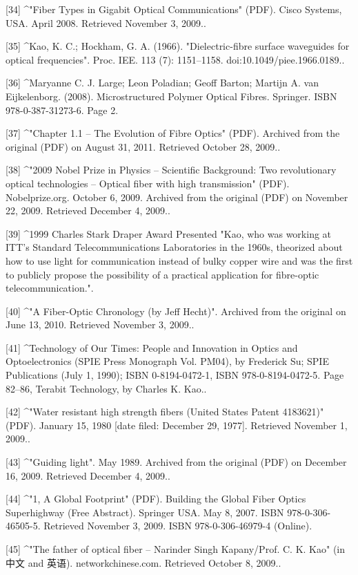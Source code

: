 [34]
^"Fiber Types in Gigabit Optical Communications" (PDF). Cisco Systems, USA. April 2008. Retrieved November 3, 2009..

[35]
^Kao, K. C.; Hockham, G. A. (1966). "Dielectric-fibre surface waveguides for optical frequencies". Proc. IEE. 113 (7): 1151–1158. doi:10.1049/piee.1966.0189..

[36]
^Maryanne C. J. Large; Leon Poladian; Geoff Barton; Martijn A. van Eijkelenborg. (2008). Microstructured Polymer Optical Fibres. Springer. ISBN 978-0-387-31273-6. Page 2.

[37]
^"Chapter 1.1 – The Evolution of Fibre Optics" (PDF). Archived from the original (PDF) on August 31, 2011. Retrieved October 28, 2009..

[38]
^"2009 Nobel Prize in Physics – Scientific Background: Two revolutionary optical technologies – Optical fiber with high transmission" (PDF). Nobelprize.org. October 6, 2009. Archived from the original (PDF) on November 22, 2009. Retrieved December 4, 2009..

[39]
^1999 Charles Stark Draper Award Presented "Kao, who was working at ITT's Standard Telecommunications Laboratories in the 1960s, theorized about how to use light for communication instead of bulky copper wire and was the first to publicly propose the possibility of a practical application for fibre-optic telecommunication.".

[40]
^"A Fiber-Optic Chronology (by Jeff Hecht)". Archived from the original on June 13, 2010. Retrieved November 3, 2009..

[41]
^Technology of Our Times: People and Innovation in Optics and Optoelectronics (SPIE Press Monograph Vol. PM04), by Frederick Su; SPIE Publications (July 1, 1990); ISBN 0-8194-0472-1, ISBN 978-0-8194-0472-5. Page 82–86, Terabit Technology, by Charles K. Kao..

[42]
^"Water resistant high strength fibers (United States Patent 4183621)" (PDF). January 15, 1980 [date filed: December 29, 1977]. Retrieved November 1, 2009..

[43]
^"Guiding light". May 1989. Archived from the original (PDF) on December 16, 2009. Retrieved December 4, 2009..

[44]
^"1, A Global Footprint" (PDF). Building the Global Fiber Optics Superhighway (Free Abstract). Springer USA. May 8, 2007. ISBN 978-0-306-46505-5. Retrieved November 3, 2009. ISBN 978-0-306-46979-4 (Online).

[45]
^"The father of optical fiber – Narinder Singh Kapany/Prof. C. K. Kao" (in 中文 and 英语). networkchinese.com. Retrieved October 8, 2009..

